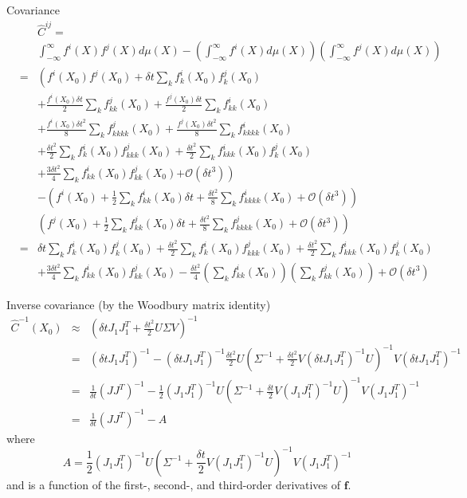 \documentclass[12pt]{article}
\begin{document}
Covariance
\begin{eqnarray}
&& \hat{C}^{ij} = \\ 
&& \int_{-\infty}^{\infty} f^i(X) f^j(X) d\mu(X) - \left(\int_{-\infty}^{\infty} f^i(X) d\mu(X) \right) \left(\int_{-\infty}^{\infty} f^j(X) d\mu(X) \right) \\
&=& \left( f^i(X_0) f^j(X_0) 
 + \delta t \sum_k f^i_k(X_0)  f^j_k(X_0) \right.   \\
&&  + \frac{f^i(X_0) \delta t}{2} \sum_{k} f^j_{kk}(X_0)
+ \frac{f^j(X_0) \delta t}{2} \sum_{k} f^i_{kk}(X_0)  \\
&&+ \frac{f^i(X_0) \delta t^2}{8} \sum_{k} f^j_{kkkk} (X_0) 
+ \frac{f^j(X_0) \delta t^2}{8} \sum_{k} f^i_{kkkk} (X_0)\\
&& + \frac{\delta t^2}{2} \sum_k f^i_k(X_0) f^j_{kkk} (X_0)  
 + \frac{\delta t^2}{2} \sum_k f^i_{kkk} (X_0) f^j_k(X_0) \\
&&+  \frac{3  \delta t^2}{4} \sum_{k} f^i_{kk}(X_0) f^j_{kk}(X_0) 
 \left.+ \mathcal{O}\left( \delta t^3 \right) \right) \\
&&- \left( f^i(X_0) + \frac{1}{2} \sum_k f^i_{kk}(X_0) \delta t + \frac{\delta t^2}{8} \sum_{k} f^i_{kkkk} (X_0) + \mathcal{O} (\delta t^3 ) \right) \\
&&\left( f^j(X_0) + \frac{1}{2} \sum_k f^j_{kk}(X_0) \delta t + \frac{\delta t^2}{8} \sum_{k} f^j_{kkkk} (X_0) + \mathcal{O} (\delta t^3 ) \right) \\
&=&
\delta t \sum_k f^i_k(X_0)  f^j_k(X_0) 
+ \frac{\delta t^2}{2} \sum_k f^i_k(X_0) f^j_{kkk} (X_0)  
 + \frac{\delta t^2}{2} \sum_k f^i_{kkk} (X_0) f^j_k(X_0) \\
&&+  \frac{3 \delta t^2}{4} \sum_{k} f^i_{kk}(X_0) f^j_{kk}(X_0) 
- \frac{\delta t^2}{4} \left( \sum_k f^i_{kk}(X_0) \right) \left( \sum_k f^j_{kk}(X_0) \right) 
 + \mathcal{O}\left( \delta t^3 \right) 
\end{eqnarray}

Inverse covariance (by the Woodbury matrix identity)
\begin{eqnarray}
\hat{C}^{-1}(X_0) &\approx & 
\left( \delta t J_1 J_1^T + \frac{\delta t^2}{2}  U \Sigma V \right)^{-1} \\
&=& \left( \delta t J_1 J_1^T \right)^{-1} - 
\left( \delta t J_1 J_1^T \right)^{-1} \frac{\delta t^2}{2} U \left(\Sigma^{-1} + \frac{\delta t^2}{2} V \left( \delta t J_1 J_1^T \right)^{-1} U \right)^{-1} V \left( \delta t J_1 J_1^T \right)^{-1} \\
&=& \frac{1}{\delta t} \left( J J^T \right)^{-1}
- \frac{1}{2} (J_1 J_1^T)^{-1} U \left(\Sigma^{-1} + \frac{\delta t}{2} V \left( J_1 J_1^T \right)^{-1} U \right)^{-1} V \left( J_1 J_1^T \right)^{-1}  \\
&=& \frac{1}{\delta t} \left( J J^T \right)^{-1} - A
\end{eqnarray}
%
where 
\begin{equation}
A = \frac{1}{2} (J_1 J_1^T)^{-1} U \left(\Sigma^{-1} + \frac{\delta t}{2} V \left( J_1 J_1^T \right)^{-1} U \right)^{-1} V \left( J_1 J_1^T \right)^{-1}
\end{equation}
 and is a function of the first-, second-, and third-order derivatives of $\mathbf{f}$.
\end{document}
